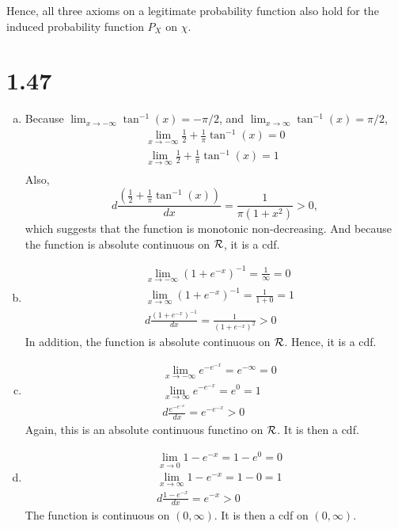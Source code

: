\documentclass[letter]{article}
\begin{document}
    Hence, all three axioms on a legitimate probability function also hold for
    the induced probability function $P_X$ on $\chi$.
    \section*{1.47}
    \begin{enumerate}[(a)]
        \item Because $\lim_{x \to -\infty} \tan^{-1}(x) = -\pi /2$, and $\lim_{x \to \infty} \tan^{-1}(x) = \pi/2$,
        \begin{multline*}
            \lim_{x \to -\infty} \frac{1}{2} + \frac{1}{\pi} \tan^{-1}(x) = 0\\
            \lim_{x \to \infty} \frac{1}{2} + \frac{1}{\pi} \tan^{-1}(x) = 1\\
        \end{multline*}
        Also,
        \[
        d \frac{(\frac{1}{2}+\frac{1}{\pi} \tan^{-1}(x))}{dx} = \frac{1}{\pi(1+x^2)} > 0,
        \]
        which suggests that the function is monotonic non-decreasing. 
        And because the function is absolute continuous on $\cal R$, it is a cdf.
        \item 
        \begin{align*}
        & \lim_{x \to -\infty} (1+e^{-x})^{-1} = \frac{1}{\infty} = 0 \\
        & \lim_{x \to \infty} (1+e^{-x})^{-1} = \frac{1}{1+0} = 1 \\
        & d \frac{(1+e^{-x})^{-1}}{dx} = \frac{1}{(1+e^{-x})^2} > 0
        \end{align*}
        In addition, the function is absolute continuous on $\cal R$. Hence, it is a cdf.

        \item 
        \begin{align*}
        & \lim_{x \to -\infty} e^{-e^{-x}} = e^{-\infty} = 0 \\
        & \lim_{x \to \infty} e^{-e^{-x}} = e^0 = 1 \\
        & d \frac{e^{-e^{-x}}}{dx} = e^{-e^{-x}} > 0
        \end{align*}
        Again, this is an absolute continuous functino on $\cal R$. It is then a cdf.

        \item 
        \begin{align*}
        & \lim_{x \to 0} 1-e^{-x} = 1-e^0 = 0 \\
        & \lim_{x \to \infty} 1- e^{-x} = 1 - 0 = 1 \\
        & d \frac{1-e^{-x}}{dx} = e^{-x} > 0
        \end{align*}
        The function is continuous on $(0, \infty)$. It is then a cdf on $(0, \infty)$.


\end{enumerate}
\end{document}
